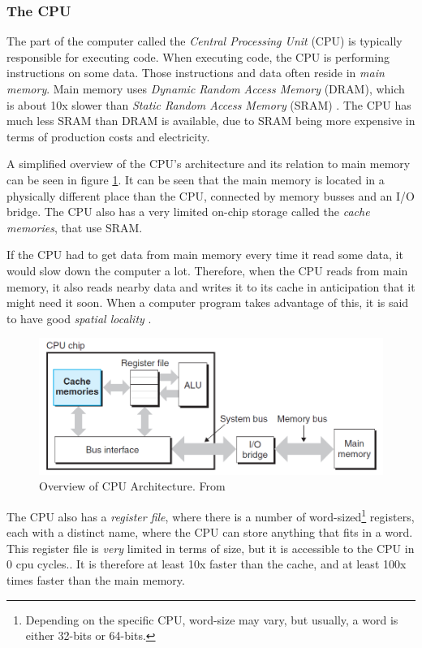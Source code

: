 \subsubsection{The CPU}

The part of the computer called the \textit{Central Processing Unit} (CPU) is typically responsible for executing code. When executing code, the CPU is performing instructions on some data. Those instructions and data often reside in \textit{main memory}. Main memory uses \textit{Dynamic Random Access Memory} (DRAM), which is about 10x slower than \textit{Static Random Access Memory} (SRAM) \cite[p. 561-562]{computersystems}. The CPU has much less SRAM than DRAM is available, due to SRAM being more expensive in terms of production costs and electricity.

A simplified overview of the CPU's architecture and its relation to main memory can be seen in figure \ref{fig:cpu_architecture}. It can be seen that the main memory is located in a physically different place than the CPU, connected by memory busses and an I/O bridge. The CPU also has a very limited on-chip storage called the \textit{cache memories}, that use SRAM.

If the CPU had to get data from main memory every time it read some data, it would slow down the computer a lot. Therefore, when the CPU reads from main memory, it also reads nearby data and writes it to its cache in anticipation that it might need it soon. When a computer program takes advantage of this, it is said to have good \textit{spatial locality} \cite[p. 640]{computersystems}.

\begin{figure}[h]
\includegraphics[width=\textwidth]{Documents/Report/Figures/CPU Architecture.png}
\caption{Overview of CPU Architecture. From \cite{computersystems}}
\label{fig:cpu_architecture}
\end{figure}

The CPU also has a \textit{register file}, where there is a number of word-sized\footnote{Depending on the specific CPU, word-size may vary, but usually, a word is either 32-bits or 64-bits.} registers, each with a distinct name, where the CPU can store anything that fits in a word. This register file is \textit{very} limited in terms of size, but it is accessible to the CPU in 0 cpu cycles.\cite[p. 9-10]{computersystems}. It is therefore at least 10x faster than the cache, and at least 100x times faster than the main memory.

